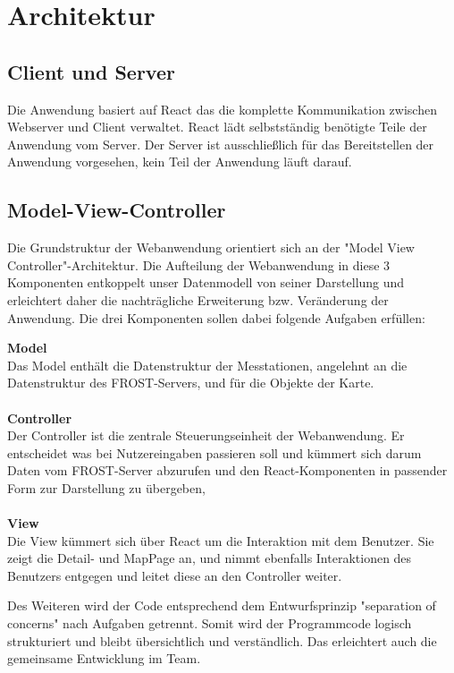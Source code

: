 \section{Architektur}

\subsection{Client und Server}
Die Anwendung basiert auf React das die komplette Kommunikation zwischen Webserver und Client verwaltet.
React lädt selbstständig benötigte Teile der Anwendung vom Server.
Der Server ist ausschließlich für das Bereitstellen der Anwendung vorgesehen, 
kein Teil der Anwendung läuft darauf.

\subsection{Model-View-Controller}
Die Grundstruktur der Webanwendung orientiert sich an der "Model View Controller"-Architektur. 
Die Aufteilung der Webanwendung in diese 3 Komponenten entkoppelt unser Datenmodell von seiner 
Darstellung und erleichtert daher die nachträgliche Erweiterung bzw. Veränderung der Anwendung.
Die drei Komponenten sollen dabei folgende Aufgaben erfüllen:
\begin{addmargin}[25pt]{0pt}
    \textbf{Model}\\
    Das Model enthält die Datenstruktur der Messtationen, angelehnt an die Datenstruktur des 
    \gls{FROST-Server}s, und für die Objekte der Karte.
    \\ \\
    \textbf{Controller}\\
    Der Controller ist die zentrale Steuerungseinheit der Webanwendung. 
    Er entscheidet was bei Nutzereingaben passieren soll und kümmert sich darum Daten 
    vom \gls{FROST-Server} abzurufen und den \gls{React}-Komponenten in passender Form zur 
    Darstellung zu übergeben,
    \\ \\
    \textbf{View}\\
    Die View kümmert sich über \gls{React} um die Interaktion 
    mit dem Benutzer. Sie zeigt die Detail- und MapPage an, und nimmt ebenfalls 
    Interaktionen des Benutzers entgegen und leitet diese an den Controller weiter.
\end{addmargin}

Des Weiteren wird der Code entsprechend dem Entwurfsprinzip "separation of concerns" nach Aufgaben getrennt. 
Somit wird der Programmcode logisch strukturiert und bleibt übersichtlich und verständlich. 
Das erleichtert auch die gemeinsame Entwicklung im Team.


